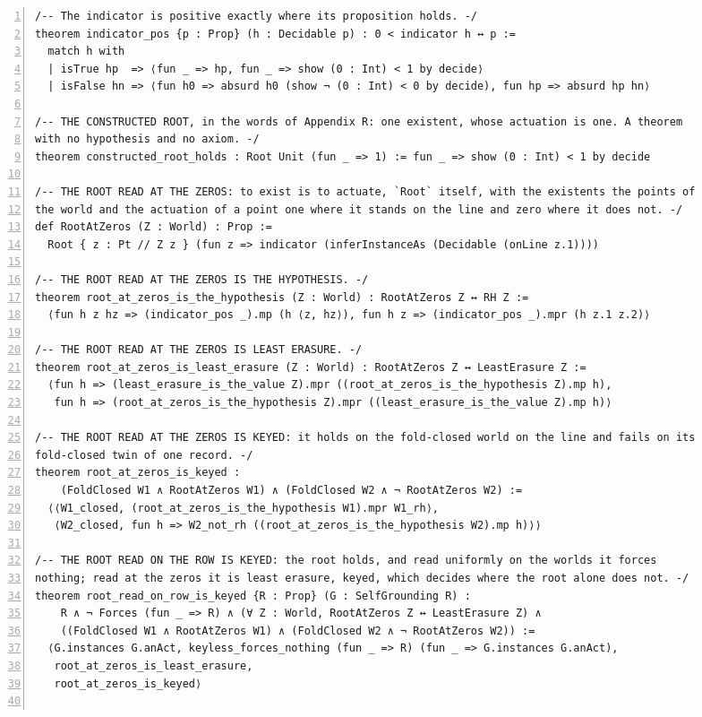 \documentclass[10pt]{article}
\newcommand{\leansize}{\fontsize{5.5pt}{6.75pt}\selectfont}
\begin{document}
\begin{multicols}{2}
\begin{Verbatim}[numbers=left,firstnumber=1,numbersep=3pt,xleftmargin=2.6em,breaklines=true,breakanywhere=true,breakautoindent=false,breakindent=1.4em,breaksymbolleft={},breakanywheresymbolpre={},fontsize=\leansize]
/-- The indicator is positive exactly where its proposition holds. -/
theorem indicator_pos {p : Prop} (h : Decidable p) : 0 < indicator h ↔ p :=
  match h with
  | isTrue hp  => ⟨fun _ => hp, fun _ => show (0 : Int) < 1 by decide⟩
  | isFalse hn => ⟨fun h0 => absurd h0 (show ¬ (0 : Int) < 0 by decide), fun hp => absurd hp hn⟩

/-- THE CONSTRUCTED ROOT, in the words of Appendix R: one existent, whose actuation is one. A theorem
with no hypothesis and no axiom. -/
theorem constructed_root_holds : Root Unit (fun _ => 1) := fun _ => show (0 : Int) < 1 by decide

/-- THE ROOT READ AT THE ZEROS: to exist is to actuate, `Root` itself, with the existents the points of
the world and the actuation of a point one where it stands on the line and zero where it does not. -/
def RootAtZeros (Z : World) : Prop :=
  Root { z : Pt // Z z } (fun z => indicator (inferInstanceAs (Decidable (onLine z.1))))

/-- THE ROOT READ AT THE ZEROS IS THE HYPOTHESIS. -/
theorem root_at_zeros_is_the_hypothesis (Z : World) : RootAtZeros Z ↔ RH Z :=
  ⟨fun h z hz => (indicator_pos _).mp (h ⟨z, hz⟩), fun h z => (indicator_pos _).mpr (h z.1 z.2)⟩

/-- THE ROOT READ AT THE ZEROS IS LEAST ERASURE. -/
theorem root_at_zeros_is_least_erasure (Z : World) : RootAtZeros Z ↔ LeastErasure Z :=
  ⟨fun h => (least_erasure_is_the_value Z).mpr ((root_at_zeros_is_the_hypothesis Z).mp h),
   fun h => (root_at_zeros_is_the_hypothesis Z).mpr ((least_erasure_is_the_value Z).mp h)⟩

/-- THE ROOT READ AT THE ZEROS IS KEYED: it holds on the fold-closed world on the line and fails on its
fold-closed twin of one record. -/
theorem root_at_zeros_is_keyed :
    (FoldClosed W1 ∧ RootAtZeros W1) ∧ (FoldClosed W2 ∧ ¬ RootAtZeros W2) :=
  ⟨⟨W1_closed, (root_at_zeros_is_the_hypothesis W1).mpr W1_rh⟩,
   ⟨W2_closed, fun h => W2_not_rh ((root_at_zeros_is_the_hypothesis W2).mp h)⟩⟩

/-- THE ROOT READ ON THE ROW IS KEYED: the root holds, and read uniformly on the worlds it forces
nothing; read at the zeros it is least erasure, keyed, which decides where the root alone does not. -/
theorem root_read_on_row_is_keyed {R : Prop} (G : SelfGrounding R) :
    R ∧ ¬ Forces (fun _ => R) ∧ (∀ Z : World, RootAtZeros Z ↔ LeastErasure Z) ∧
    ((FoldClosed W1 ∧ RootAtZeros W1) ∧ (FoldClosed W2 ∧ ¬ RootAtZeros W2)) :=
  ⟨G.instances G.anAct, keyless_forces_nothing (fun _ => R) (fun _ => G.instances G.anAct),
   root_at_zeros_is_least_erasure,
   root_at_zeros_is_keyed⟩


\end{Verbatim}
\end{multicols}
\end{document}
